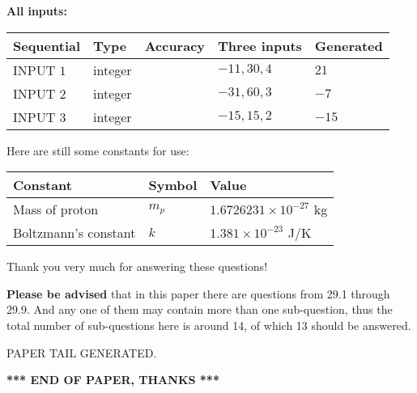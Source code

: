 \documentclass[12pt]{article}
\begin{document}
   
   
   
\noindent\vspace{0.1in}\hspace{-0.08in} {\textbf{\Large{All inputs: }}}
   
   
  
  
\noindent\begin{tabular}{|l|l|l|l|l|}
\hline
 Sequential & Type & Accuracy & Three inputs & Generated \\ 
\hline
 
 
  INPUT $           1$ & integer &  & $
 -11
 , 
 30
 , 
 4
 $ & $ 21 $ 
 \\  \hline  
 
 
  INPUT $           2$ & integer &  & $
 -31
 , 
 60
 , 
 3
 $ & $ -7 $ 
 \\  \hline  
 
 
  INPUT $           3$ & integer &  & $
 -15
 , 
 15
 , 
 2
 $ & $ -15 $ 
 \\  \hline  
 \end{tabular}
   
   
   
   
   
   
 \vspace{0.2in}
Here are still some constants for use:
 
 
\noindent\begin{tabular}{|l|l|l|}
\hline
Constant & Symbol & Value \\
\hline
 
Mass of proton &
$m_p$ &
 $ 1.6726231 \times 10^{-27} $
kg \\
\hline
 
Boltzmann's constant &
$k$ &
 $ 1.381 \times 10^{-23} $
J/K \\
\hline
 
\end{tabular}
 
Thank you very much for answering these questions!
 
{\textbf{\large{Please be advised}}} that in this paper there are questions from
29.1 through
29.9.
And any one of them may contain more than one sub-question, thus the total number
of sub-questions here is around 14, of which
13 should be answered.
 
   
   
\vspace{2.0in} PAPER TAIL GENERATED.
   
   
   
   
\vspace{1.0in} 
{\textbf{\large{ *** END OF PAPER, THANKS *** }}} 
   
\end{document}
